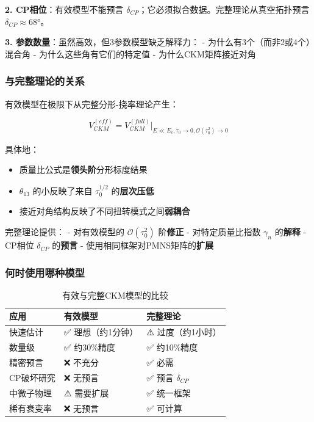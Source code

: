 \textbf{2. CP相位}：有效模型不能预言 $\delta_{CP}$；它必须拟合数据。完整理论从真空拓扑预言 $\delta_{CP} \approx 68°$。

\textbf{3. 参数数量}：虽然高效，但3参数模型缺乏解释力：
- 为什么有3个（而非2或4个）混合角
- 为什么这些角有它们的特定值
- 为什么CKM矩阵接近对角

\subsubsection{与完整理论的关系}

有效模型在极限下从完整分形-挠率理论产生：

\begin{equation}
    \boxed{V_{CKM}^{(eff)} = V_{CKM}^{(full)}\big|_{E \ll E_c, \tau_0 \to 0, \mathcal{O}(\tau_0^2) \to 0}}
\end{equation}

具体地：

\begin{itemize}
    \item 质量比公式是\textbf{领头阶}分形标度结果
    \item $\theta_{13}$ 的小反映了来自 $\tau_0^{1/2}$ 的\textbf{层次压低}
    \item 接近对角结构反映了不同扭转模式之间\textbf{弱耦合}
\end{itemize}

完整理论提供：
- 对有效模型的 $\mathcal{O}(\tau_0^2)$ 阶\textbf{修正}
- 对特定质量比指数 $\gamma_n$ 的\textbf{解释}
- CP相位 $\delta_{CP}$ 的\textbf{预言}
- 使用相同框架对PMNS矩阵的\textbf{扩展}

\subsubsection{何时使用哪种模型}

\begin{table}[h]
\centering
\begin{tabular}{p{3.5cm}p{4.5cm}p{4.5cm}}
\hline
\textbf{应用} & \textbf{有效模型} & \textbf{完整理论} \\
\hline
快速估计 & ✅ 理想（约1分钟） & ⚠️ 过度（约1小时） \\
数量级 & ✅ 约30\%精度 & ✅ 约10\%精度 \\
精密预言 & ❌ 不充分 & ✅ 必需 \\
CP破坏研究 & ❌ 无预言 & ✅ 预言 $\delta_{CP}$ \\
中微子物理 & ⚠️ 需要扩展 & ✅ 统一框架 \\
稀有衰变率 & ❌ 无预言 & ✅ 可计算 \\
\hline
\end{tabular}
\caption{有效与完整CKM模型的比较}
\end{table}

